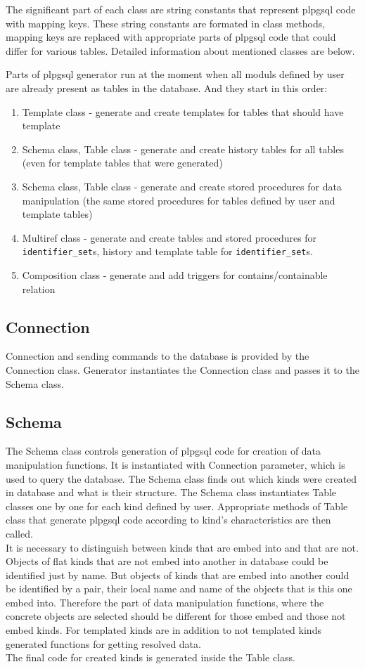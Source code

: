 \documentclass[deska]{subfiles}
\begin{document}
The significant part of each class are string constants that represent plpgsql code with mapping keys. These string constants are formated in class methods, mapping keys are replaced with appropriate parts of plpgsql code that could differ for various tables.
Detailed information about mentioned classes are below.

Parts of plpgsql generator run at the moment when all moduls defined by user are already present as tables in the database. And they start in this order:

\begin{enumerate}
    \item Template class - generate and create templates for tables that should have template
    \item Schema class, Table class - generate and create history tables for all tables (even for template tables that were generated)
    \item Schema class, Table class - generate and create stored procedures for data manipulation (the same stored procedures for tables defined by user and template tables)
    \item Multiref class - generate and create tables and stored procedures for {\tt identifier\_set}s, history and template table for {\tt identifier_set}s.
    \item Composition class - generate and add triggers for contains/containable relation
\end{enumerate}

\subsection{Connection}
Connection and sending commands to the database is provided by the Connection class. Generator instantiates the Connection class and passes it to the Schema class.

\subsection{Schema}
The Schema class controls generation of plpgsql code for creation of data manipulation functions. It is instantiated with Connection parameter, which is used to query the database. 
The Schema class finds out which kinds were created in database and what is their structure. The Schema class instantiates Table classes one by one for each kind defined by user. Appropriate methods of Table class that generate plpgsql code according to kind's characteristics are then called.\\ It is necessary to distinguish between kinds that are embed into and that are not. Objects of flat kinds that are not embed into another in database could be identified just by name. But objects of kinds that are embed into another could be identified by a pair, their local name and name of the objects that is this one embed into. Therefore the part of data manipulation functions, where the concrete objects are selected should be different for those embed and those not embed kinds.
For templated kinds are in addition to not templated kinds generated functions for getting resolved data.\\
The final code for created kinds is generated inside the Table class.
\end{document}
